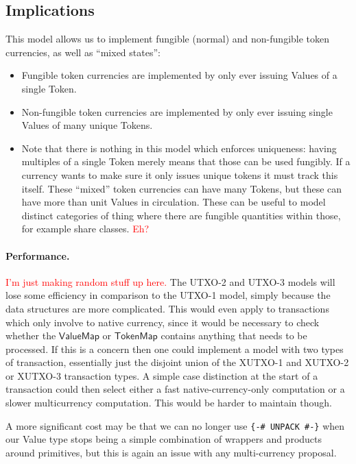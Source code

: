 \documentclass[a4paper]{article}
\newcommand{\red}[1]{\textcolor{red}{#1}}
\newcommand{\s}{\textsf}  %
\theoremstyle{definition}  %
\newcommand{\valuemap}{\ensuremath{\s{ValueMap}}}
\newcommand{\tokenmap}{\ensuremath{\s{TokenMap}}}
\begin{document}
\subsection{Implications}
This model allows us to implement fungible (normal) and non-fungible
token currencies, as well as ``mixed states'':
\begin{itemize}
\item Fungible token currencies are implemented by only ever issuing
  \s{Value}s of a single \s{Token}.
\item Non-fungible token currencies are implemented by only ever
  issuing single \s{Value}s of many unique \s{Token}s.
\item Note that there is nothing in this model which enforces
  uniqueness: having multiples of a single \s{Token} merely means that
  those can be used fungibly. If a currency wants to make sure it only
  issues unique tokens it must track this itself.  These ``mixed'' token
  currencies can have many \s{Token}s, but these can have more than unit
  \s{Value}s in circulation.  These can be useful to model distinct
  categories of thing where there are fungible quantities within
  those, for example share classes. \red{Eh?}
\end{itemize}

\paragraph{Performance.}
\red{I'm just making random stuff up here.}
The UTXO-2 and UTXO-3 models will lose some efficiency in comparison
to the UTXO-1 model, simply because the data structures are more
complicated.  This would even apply to transactions which only involve
to native currency, since it would be necessary to check whether the
\valuemap{} or \tokenmap{} contains anything that needs to be processed.  If this is
a concern then one could implement a model with two types of
transaction, essentially just the disjoint union of the XUTXO-1 and
XUTXO-2 or XUTXO-3 transaction types. A simple case distinction at the
start of a transaction could then select either a fast
native-currency-only computation or a slower multicurrency computation.
This would be harder to maintain though.

\medskip
A more significant cost may be that we can no longer use \verb|{-# UNPACK #-}|
when our Value type stops being a simple combination of wrappers
and products around primitives, but this is again an issue with any
multi-currency proposal.
\end{document}
